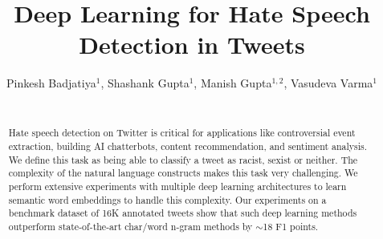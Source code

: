 \documentclass[letterpaper]{sig-alternate-2013}
\begin{document}
\title{Deep Learning for Hate Speech Detection in Tweets}

\author{
Pinkesh Badjatiya$^1$\footnotemark[2] , Shashank Gupta$^1$\footnotemark[2] , Manish Gupta$^{1,2}$, Vasudeva Varma$^1$\\
\\
}


\maketitle

\begin{abstract}
	Hate speech detection on Twitter is critical for applications like controversial event extraction, building AI chatterbots, content recommendation, and sentiment analysis. We define this task as being able to classify a tweet as racist, sexist or neither. The complexity of the natural language constructs makes this task very challenging. We perform extensive experiments with multiple deep learning architectures to learn semantic word embeddings to handle this complexity. Our experiments on a benchmark dataset of 16K annotated tweets show that such deep learning methods outperform state-of-the-art char/word n-gram methods by $\sim$18 F1 points.
\end{abstract}
{\renewcommand{\thefootnote}{\fnsymbol{footnote}}
}

\end{document}
